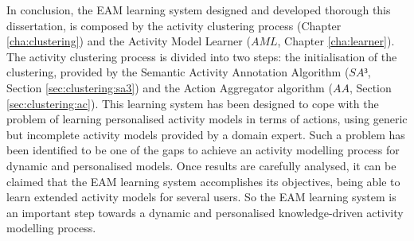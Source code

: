 In conclusion, the EAM learning system designed and developed thorough this dissertation, is composed by the activity clustering process (Chapter \ref{cha:clustering}) and the Activity Model Learner ($AML$, Chapter \ref{cha:learner}). The activity clustering process is divided into two steps: the initialisation of the clustering, provided by the Semantic Activity Annotation Algorithm ($SA³$, Section \ref{sec:clustering:sa3}) and the Action Aggregator algorithm ($AA$, Section \ref{sec:clustering:ac}). This learning system has been designed to cope with the problem of learning personalised activity models in terms of actions, using generic but incomplete activity models provided by a domain expert. Such a problem has been identified to be one of the gaps to achieve an activity modelling process for dynamic and personalised models. Once results are carefully analysed, it can be claimed that the EAM learning system accomplishes its objectives, being able to learn extended activity models for several users. So the EAM learning system is an important step towards a dynamic and personalised knowledge-driven activity modelling process. 

